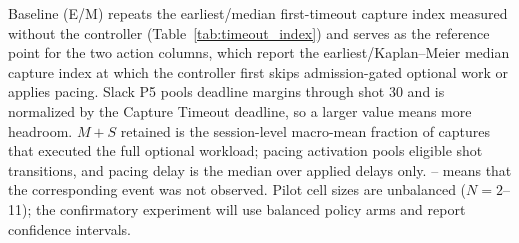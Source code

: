 \begin{table}[t]
  \par\vspace{3pt}
  {\scriptsize
  Baseline (E/M) repeats the earliest/median first-timeout capture index
  measured without the controller (Table~\ref{tab:timeout_index}) and serves
  as the reference point for the two action columns, which report the
  earliest/Kaplan--Meier median capture index at which the controller first
  skips admission-gated optional work or applies pacing.  Slack P5 pools
  deadline margins through shot 30 and is normalized by the Capture Timeout
  deadline, so a larger value means more headroom.  $M{+}S$ retained is the
  session-level macro-mean fraction of captures that executed the full
  optional workload; pacing activation pools eligible shot transitions, and
  pacing delay is the median over applied delays only.  -- means that the
  corresponding event was not observed.  Pilot cell sizes are unbalanced
  ($N=2$--11); the confirmatory experiment will use balanced policy arms and
  report confidence intervals.}
\end{table}
